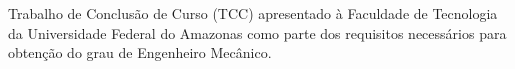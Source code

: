  \setcounter{page}{2}



%




\begin{center}
\textbf{\large{\TITULO}}


\vspace*{1.5cm} %
\normalsize{\MakeUppercase{\AUTOR}}
\end{center}
\vspace*{1cm}%
{\noindent Trabalho de Conclusão de Curso (TCC) apresentado à Faculdade de Tecnologia da Universidade Federal do Amazonas como parte dos requisitos necessários para obtenção do grau de Engenheiro Mecânico.}
\\[0.25cm]


